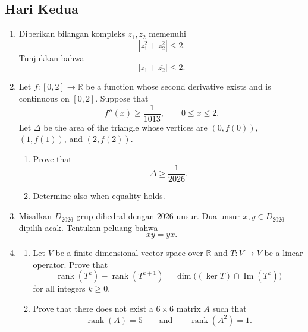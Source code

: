 \documentclass[12pt]{article}
\begin{document}
\newpage
\subsection*{Hari Kedua}

\begin{enumerate}
  \item Diberikan bilangan kompleks $z_1,z_2$ memenuhi
        \[
          |z_1^2+z_2^2|\le 2.
        \]
        Tunjukkan bahwa
        \[
          |z_1+\overline{z_2}|\le 2.
        \]

  \item Let $f:[0,2]\to\mathbb{R}$ be a function whose second derivative exists and is continuous on $[0,2]$.
        Suppose that
        \[
          f''(x)\ge \frac{1}{1013},
          \qquad 0\le x\le 2.
        \]
        Let $\Delta$ be the area of the triangle whose vertices are $(0,f(0))$, $(1,f(1))$, and $(2,f(2))$.
        \begin{enumerate}
          \item Prove that
                \[
                  \Delta\ge \frac{1}{2026}.
                \]
          \item Determine also when equality holds.
        \end{enumerate}

  \item Misalkan $D_{2026}$ grup dihedral dengan $2026$ unsur. Dua unsur $x,y\in D_{2026}$ dipilih acak.
        Tentukan peluang bahwa
        \[
          xy=yx.
        \]

  \item \begin{enumerate}
          \item Let $V$ be a finite-dimensional vector space over $\mathbb{R}$ and $T:V\to V$ be a linear operator.
                Prove that
                \[
                  \operatorname{rank}(T^k)-\operatorname{rank}(T^{k+1})
                  =
                  \dim\bigl((\ker T)\cap \operatorname{Im}(T^k)\bigr)
                \]
                for all integers $k\ge 0$.
          \item Prove that there does not exist a $6\times 6$ matrix $A$ such that
                \[
                  \operatorname{rank}(A)=5
                  \qquad\text{and}\qquad
                  \operatorname{rank}(A^2)=1.
                \]
        \end{enumerate}


\end{enumerate}
\end{document}

